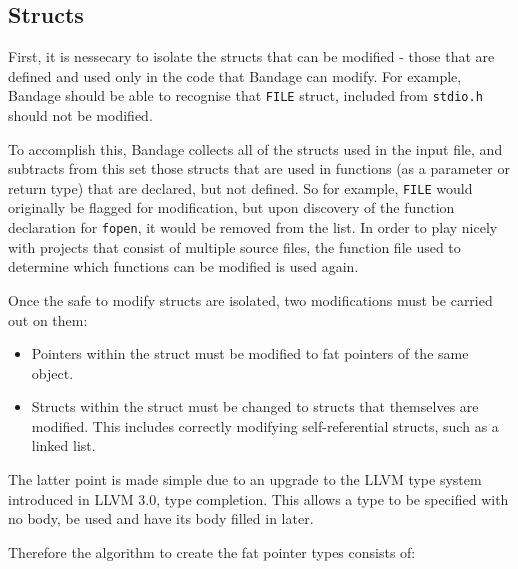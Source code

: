 \subsection{Structs}

First, it is nessecary to isolate the structs that can be modified - those that are defined and used only in the code that Bandage can modify.
For example, Bandage should be able to recognise that \verb!FILE! struct, included from \verb!stdio.h! should not be modified.

To accomplish this, Bandage collects all of the structs used in the input file, and subtracts from this set those structs that are used in functions (as a parameter or return type) that are declared, but not defined.
So for example, \verb!FILE! would originally be flagged for modification, but upon discovery of the function declaration for \verb!fopen!, it would be removed from the list.
In order to play nicely with projects that consist of multiple source files, the function file used to determine which functions can be modified is used again.

Once the safe to modify structs are isolated, two modifications must be carried out on them:

\begin{itemize}
\item Pointers within the struct must be modified to fat pointers of the same object.
\item Structs within the struct must be changed to structs that themselves are modified.
This includes correctly modifying self-referential structs, such as a linked list.
\end{itemize}

The latter point is made simple due to an upgrade to the LLVM type system introduced in LLVM 3.0, type completion.
This allows a type to be specified with no body, be used and have its body filled in later.

Therefore the algorithm to create the fat pointer types consists of:

